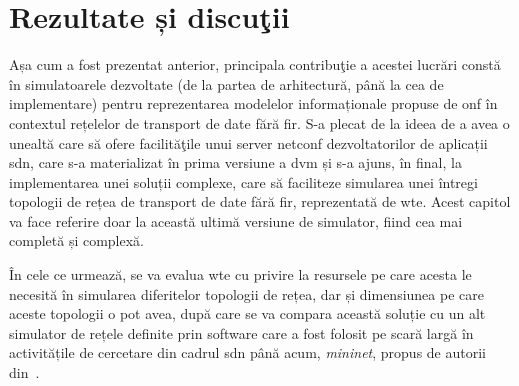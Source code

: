 \chapter{Rezultate și discuţii\label{ch:rezultate_discutii}}

\graphicspath{ {cap-rezultate_discutii/figures/} }

Așa cum a fost prezentat anterior, principala contribuţie a acestei lucrări constă în simulatoarele dezvoltate (de la partea de arhitectură, până la cea de implementare) pentru reprezentarea modelelor informaționale propuse de \gls{onf} în contextul rețelelor de transport de date fără fir. S-a plecat de la ideea de a avea o unealtă care să ofere facilităţile unui server \gls{netconf} dezvoltatorilor de aplicații \gls{sdn}, care s-a materializat în prima versiune a \gls{dvm} și s-a ajuns, în final, la implementarea unei soluții complexe, care să faciliteze simularea unei întregi topologii de rețea de transport de date fără fir, reprezentată de \gls{wte}. Acest capitol va face referire doar la această ultimă versiune de simulator, fiind cea mai completă și complexă.

În cele ce urmează, se va evalua \gls{wte} cu privire la resursele pe care acesta le necesită în simularea diferitelor topologii de rețea, dar și dimensiunea pe care aceste topologii o pot avea, după care se va compara această soluție cu un alt simulator de rețele definite prin software care a fost folosit pe scară largă în activitățile de cercetare din cadrul \gls{sdn} până acum, \textit{mininet}, propus de autorii din~\cite{lantz2010network}.



%